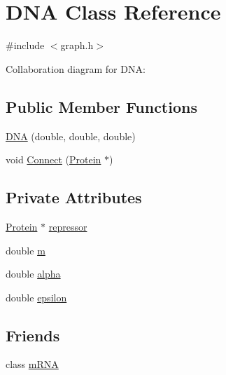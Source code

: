 \hypertarget{class_d_n_a}{\section{D\-N\-A Class Reference}
\label{class_d_n_a}
}


{\ttfamily \#include $<$graph.\-h$>$}



Collaboration diagram for D\-N\-A\-:
\subsection*{Public Member Functions}
\begin{DoxyCompactItemize}
\item 
\hyperlink{class_d_n_a_a6d92499f10d383ac656e98694cc6c5e6}{D\-N\-A} (double, double, double)
\item 
void \hyperlink{class_d_n_a_a4db79a1d4530c15f30ec82cb8a502dda}{Connect} (\hyperlink{class_protein}{Protein} $\ast$)
\end{DoxyCompactItemize}
\subsection*{Private Attributes}
\begin{DoxyCompactItemize}
\item 
\hyperlink{class_protein}{Protein} $\ast$ \hyperlink{class_d_n_a_a08dd607e26ea53375e0c6d61c0c04ba9}{repressor}
\item 
double \hyperlink{class_d_n_a_ad9f4838495b5f66e494a8adb3384b919}{m}
\item 
double \hyperlink{class_d_n_a_a30c4d522f315530f9ce72e84afd6804c}{alpha}
\item 
double \hyperlink{class_d_n_a_a0dbd4309884cc23e9cbaf6cf4dc5ba0e}{epsilon}
\end{DoxyCompactItemize}
\subsection*{Friends}
\begin{DoxyCompactItemize}
\item 
class \hyperlink{class_d_n_a_a904bf77ec17baad950eb63ea5c40c6ea}{m\-R\-N\-A}
\end{DoxyCompactItemize}


